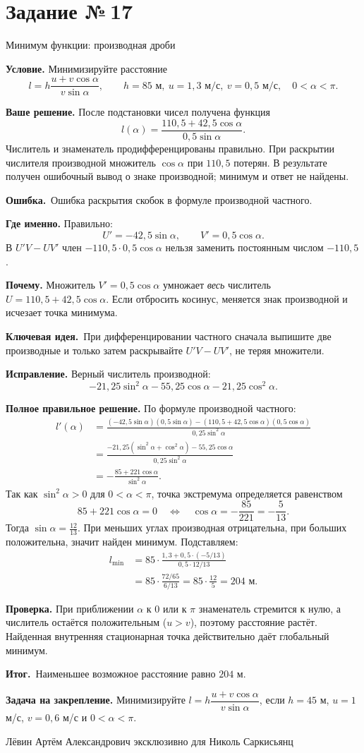 \documentclass[a4paper,11pt]{article}
\newcommand{\Hdr}[1]{\par\vspace{2pt}\noindent\textbf{#1}\quad}
\newcommand{\E}{\par\smallskip\noindent\textcolor{errorred}{\textbf{Ошибка.}}\ }
\newcommand{\K}{\par\smallskip\noindent\textcolor{accent}{\textbf{Ключевая идея.}}\ }
\newcommand{\I}{\par\smallskip\noindent\textcolor{accent}{\textbf{Итог.}}\ }
\newcommand{\Task}[2]{\clearpage\phantomsection\label{task:#1}\section*{Задание №\,#1}\textcolor{accent}{#2}\par\vspace{7pt}}
\newcommand{\Footer}{\par\vfill\begin{center}\footnotesize\color{ink}Лёвин Артём Александрович эксклюзивно для Николь Саркисьянц\end{center}}
\begin{document}
\Task{17}{Минимум функции: производная дроби}
\Hdr{Условие.} Минимизируйте расстояние
\[
l=h\frac{u+v\cos\alpha}{v\sin\alpha},\qquad h=85\text{ м},\ u=1{,}3\text{ м/с},\ v=0{,}5\text{ м/с},\quad 0<\alpha<\pi.
\]
\Hdr{Ваше решение.} После подстановки чисел получена функция
\[l(\alpha)=\frac{110{,}5+42{,}5\cos\alpha}{0{,}5\sin\alpha}.\]
Числитель и знаменатель продифференцированы правильно. При раскрытии числителя производной множитель $\cos\alpha$ при $110{,}5$ потерян. В результате получен ошибочный вывод о знаке производной; минимум и ответ не найдены.
\E Ошибка раскрытия скобок в формуле производной частного.
\Hdr{Где именно.} Правильно:
\[
U'= -42{,}5\sin\alpha,\qquad V'=0{,}5\cos\alpha.
\]
В $U'V-UV'$ член $-110{,}5\cdot0{,}5\cos\alpha$ нельзя заменить постоянным числом $-110{,}5$.
\Hdr{Почему.} Множитель $V'=0{,}5\cos\alpha$ умножает \emph{весь} числитель $U=110{,}5+42{,}5\cos\alpha$. Если отбросить косинус, меняется знак производной и исчезает точка минимума.
\K При дифференцировании частного сначала выпишите две производные и только затем раскрывайте $U'V-UV'$, не теряя множители.
\Hdr{Исправление.} Верный числитель производной:
\[
-21{,}25\sin^2\alpha-55{,}25\cos\alpha
-21{,}25\cos^2\alpha.
\]
\Hdr{Полное правильное решение.} По формуле производной частного:
\[
\begin{aligned}
l'(\alpha)
&=\frac{(-42{,}5\sin\alpha)(0{,}5\sin\alpha)
-(110{,}5+42{,}5\cos\alpha)(0{,}5\cos\alpha)}{0{,}25\sin^2\alpha}\\
&=\frac{-21{,}25(\sin^2\alpha+\cos^2\alpha)-55{,}25\cos\alpha}{0{,}25\sin^2\alpha}\\
&=-\frac{85+221\cos\alpha}{\sin^2\alpha}.
\end{aligned}
\]
Так как $\sin^2\alpha>0$ для $0<\alpha<\pi$, точка экстремума определяется равенством
\[
85+221\cos\alpha=0
\quad\Longleftrightarrow\quad
\cos\alpha=-\frac{85}{221}=-\frac5{13}.
\]
Тогда $\sin\alpha=\frac{12}{13}$. При меньших углах производная отрицательна, при больших положительна, значит найден минимум. Подставляем:
\[
\begin{aligned}
l_{\min}
&=85\cdot\frac{1{,}3+0{,}5\cdot(-5/13)}{0{,}5\cdot12/13}\\
&=85\cdot\frac{72/65}{6/13}
=85\cdot\frac{12}{5}=\boxed{204\text{ м}}.
\end{aligned}
\]
\Hdr{Проверка.} При приближении $\alpha$ к $0$ или к $\pi$ знаменатель стремится к нулю, а числитель остаётся положительным ($u>v$), поэтому расстояние растёт. Найденная внутренняя стационарная точка действительно даёт глобальный минимум.
\I Наименьшее возможное расстояние равно $204$ м.
\Hdr{Задача на закрепление.} Минимизируйте $l=h\dfrac{u+v\cos\alpha}{v\sin\alpha}$, если $h=45$ м, $u=1$ м/с, $v=0{,}6$ м/с и $0<\alpha<\pi$.
\Footer
\end{document}
